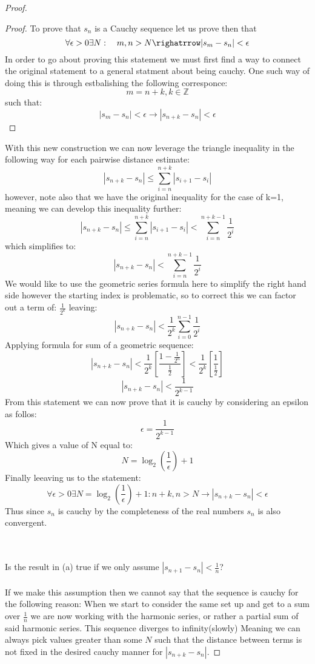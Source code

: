 \documentclass[11pt]{article}
\theoremstyle{definition}  %
\newcommand{\Z}{\mathbb{Z}}
\begin{document}
\begin{enumerate}
\begin{proof}
\begin{proof}
    To prove that $s_n$ is a Cauchy sequence let us prove then that \[
      \forall \epsilon>0 \exists N: \quad m,n>N \righatrrow |s_m-s_n|<\epsilon
    \]
    In order to go about proving this statement we must first find a way to connect the original statement to a general statment about being cauchy. One such way of doing this is through estbalishing the following corresponce:
    \[
      m=n+k, k \in \Z
    \]
    such that:
    \[
      |s_m-s_n|<\epsilon\rightarrow |s_{n+k}-s_n|<\epsilon
      \]
    \end{proof}
    With this new construction we can now leverage the triangle inequality in the following way for each pairwise distance estimate:
    \[
      |s_{n+k}-s_n|\leq \sum_{i=n}^{n+k}|s_{i+1}-s_i|
    \]
    however, note also that we have the original inequality for the case of k=1, meaning we can develop this inequality further:
    \[
      |s_{n+k}-s_n|\leq \sum_{i=n}^{n+k}|s_{i+1}-s_i|<\sum_{i=n}^{n+k-1}\frac{1}{2^i}
    \]
    which simplifies to:
    \[
      |s_{n+k}-s_n|<\sum_{i=n}^{n+k-1}\frac{1}{2^i}
    \]
    We would like to use the geometric series formula here to simplify the right hand side however the starting index is problematic, so to correct this we can factor out a term of: $\frac{1}{2^k}$ leaving:
    \[
      |s_{n+k}-s_n|<\frac{1}{2^k}\sum_{i=0}^{n-1}\frac{1}{2^i}
    \]
    Applying formula for sum of a geometric sequence:
    \[
        |s_{n+k}-s_n|<\frac{1}{2^k}\left[\frac{1-\frac{1}{2^n}}{\frac{1}{2}}\right]<\frac{1}{2^k}\left[\frac{1}{\frac{1}{2}}\right]
    \]
    \[
      |s_{n+k}-s_n|<\frac{1}{2^{k-1}}
    \]
    From this statement we can now prove that it is cauchy by considering an epsilon as follos:
    \[
      \epsilon=\frac{1}{2^{k-1}}
    \]
    Which gives a value of N equal to:
    \[
      N=\log_2(\frac{1}{\epsilon})+1
    \]
    Finally leeaving us to the statement:
    $$\forall \epsilon >0 \exists N=\log_2(\frac{1}{\epsilon})+1: n+k,n>N \rightarrow |s_{n+k}-s_n|<\epsilon$$
    Thus since $s_n$ is cauchy by the completeness of the real numbers $s_n$ is also convergent.\\\\
    \item\\
    Is the result in (a) true if we only assume $|s_{n+1}-s_n|<\frac{1}{n}$?
    \\\\ If we make this assumption then we cannot say that the sequence is cauchy for the following reason:
    When we start to consider the same set up and get to a sum over $\frac{1}{n}$ we are now working with the harmonic series, or rather a partial sum of said harmonic series. This sequence diverges to infinity(slowly) Meaning we can always pick values greater than some $N$ such that the distance between terms is not fixed in the desired cauchy manner for $|s_{n+k}-s_n|$.

\end{proof}
\end{enumerate}
\end{document}
